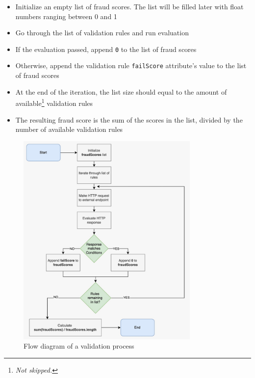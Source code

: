       \begin{itemize}
        \item Initialize an empty list of fraud scores. The list will be filled later with float numbers ranging between 0 and 1
        \item Go through the list of validation rules and run evaluation
        \item If the evaluation passed, append \verb;0; to the list of fraud scores
        \item Otherwise, append the validation rule \verb;failScore; attribute's value to the list of fraud scores
        \item At the end of the iteration, the list size should equal to the amount of available\footnote{\emph{Not skipped.}} validation rules
        \item The resulting fraud score is the sum of the scores in the list, divided by the number of available validation rules
      \end{itemize}

      \begin{figure}[!ht]
        \centering
        \includegraphics[width=0.8\textwidth]{diagrams/flow_validation_process.jpeg}
        \caption{Flow diagram of a validation process}
        \label{fig:flow_validation}
      \end{figure}
      
